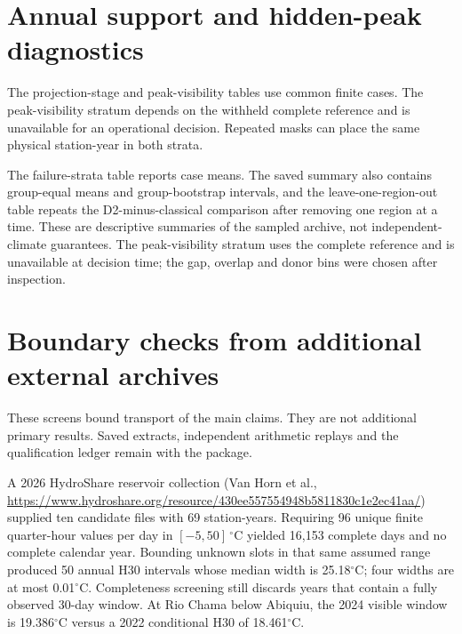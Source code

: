 \documentclass[draft,wrr]{agutexSI2019}
\begin{document}
\begin{article}
\section{Annual support and hidden-peak diagnostics}
The projection-stage and peak-visibility tables use common finite cases. The peak-visibility stratum depends on the withheld complete reference and is unavailable for an operational decision. Repeated masks can place the same physical station-year in both strata.



The failure-strata table reports case means. The saved summary also contains group-equal means and group-bootstrap intervals, and the leave-one-region-out table repeats the D2-minus-classical comparison after removing one region at a time. These are descriptive summaries of the sampled archive, not independent-climate guarantees. The peak-visibility stratum uses the complete reference and is unavailable at decision time; the gap, overlap and donor bins were chosen after inspection.

\clearpage


\clearpage


\clearpage



\clearpage










\section{Boundary checks from additional external archives}
These screens bound transport of the main claims. They are not additional primary results. Saved extracts, independent arithmetic replays and the qualification ledger remain with the package.

A 2026 HydroShare reservoir collection (Van Horn et al., \url{https://www.hydroshare.org/resource/430ee557554948b5811830c1e2ec41aa/}) supplied ten candidate files with 69 station-years. Requiring 96 unique finite quarter-hour values per day in $[-5,50]\,^{\circ}\mathrm{C}$ yielded 16,153 complete days and no complete calendar year. Bounding unknown slots in that same assumed range produced 50 annual H30 intervals whose median width is 25.18$^{\circ}$C; four widths are at most 0.01$^{\circ}$C. Completeness screening still discards years that contain a fully observed 30-day window. At Rio Chama below Abiquiu, the 2024 visible window is 19.386$^{\circ}$C versus a 2022 conditional H30 of 18.461$^{\circ}$C.


\end{article}
\end{document}
